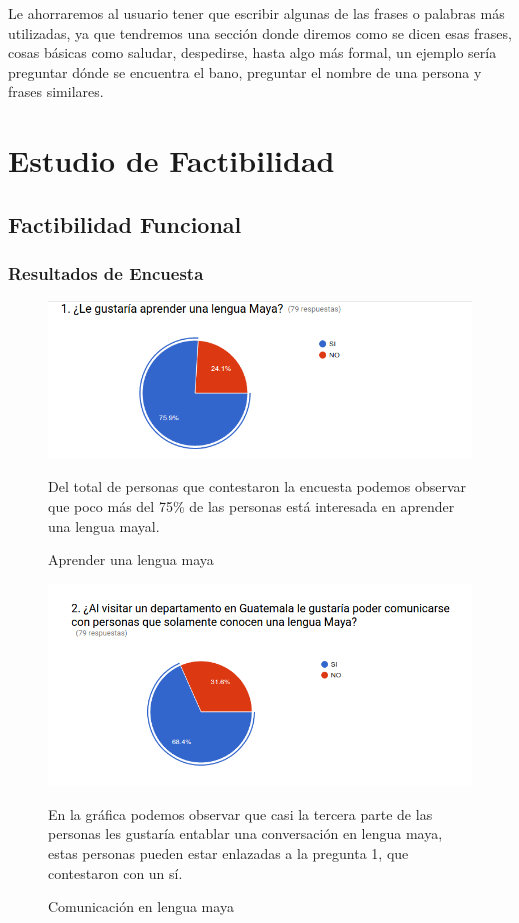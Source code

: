 \documentclass[a4paper,openright,11pt]{article}
\begin{document}
Le ahorraremos al usuario tener que escribir algunas de las frases o palabras m\'as utilizadas, ya que tendremos una secci\'on donde diremos como se dicen esas frases, cosas b\'asicas como saludar, despedirse, hasta algo m\'as formal, un ejemplo ser\'ia preguntar d\'onde se encuentra el bano, preguntar el nombre de una persona y frases similares.\\
\newpage

\section{Estudio de Factibilidad}
\subsection{Factibilidad Funcional}
\subsubsection{Resultados de Encuesta}
\begin{figure}[H]
	\centering
	\includegraphics[width=1.0\textwidth]{e1}
	\caption{Aprender una lengua maya}
	\label{fig:e1}
	Del total de personas que contestaron la encuesta podemos observar que poco más del 75\% de las personas está interesada en aprender una lengua mayal.
\end{figure}
\begin{figure}[H]
	\centering
	\includegraphics[width=1.0\textwidth]{e2}
	\caption{Comunicación en lengua maya}
	\label{fig:e2}
	En la gráfica podemos observar que casi la tercera parte de las personas les gustaría entablar una conversación en lengua maya, estas personas pueden estar enlazadas a la pregunta 1, que contestaron con un sí.
\end{figure}
\end{document}
